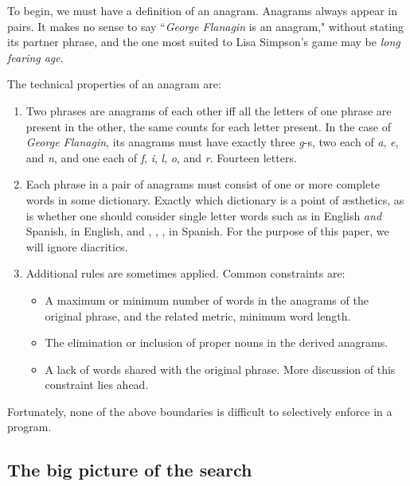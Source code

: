 \documentclass[letterpaper, 11pt]{article}
\begin{document}
To begin, we must have a definition of an anagram. Anagrams
always appear in pairs.  It makes no sense to say ``\emph{George
Flanagin} is an anagram," without stating its partner phrase, and the
one most suited to Lisa Simpson's game may be
\emph{long fearing age}. 

The technical properties of an anagram are:

\begin{enumerate}
\item Two phrases are anagrams of each other iff all the letters of
one phrase are present in the other, the same counts for each letter
present.
In the case of \emph{George Flanagin}, its
anagrams must have exactly three \emph{g}-s, two each of \emph{a},
\emph{e}, and \emph{n}, and one each of \emph{f}, \emph{i}, \emph{l},
\emph{o}, and \emph{r}.  Fourteen letters.

\item Each phrase in a pair of anagrams must consist of one or more complete words in some dictionary.
Exactly which dictionary is a point of {\ae}sthetics, as is whether
one should consider single letter words such as  in English
\emph{and} Spanish,  in English, and , , ,  in Spanish.
For the purpose of this paper, we will ignore diacritics.

\item Additional rules are sometimes applied. Common constraints are:

\begin{itemize}
\item A maximum or minimum number of words in the anagrams of the original phrase,
and the related metric, minimum word length.

\item The elimination or inclusion of proper nouns in the derived
anagrams.

\item A lack of words shared with the original phrase. More discussion of this 
constraint lies ahead.
\end{itemize}
\end{enumerate}

Fortunately, none of the above boundaries is difficult to selectively
enforce in a program. 

\subsection{The big picture of the search}
\label{sec:bigpicture}
\end{document}
